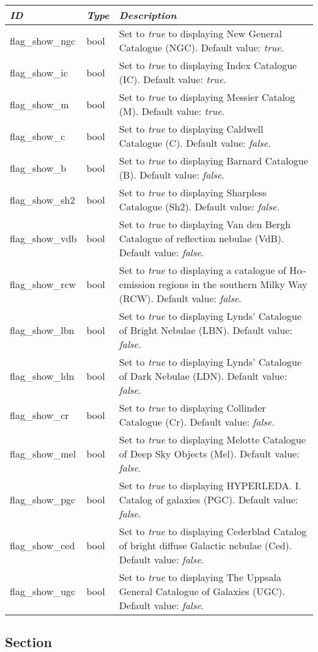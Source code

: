 \begin{longtabu} to \textwidth {l|l|X}
\toprule
\emph{ID} & \emph{Type} & \emph{Description}\tabularnewline
\midrule
flag\_show\_ngc & bool & Set to \emph{true} to displaying New General Catalogue (NGC). Default value: \emph{true}. \tabularnewline
\midrule
flag\_show\_ic & bool & Set to \emph{true} to
displaying Index Catalogue (IC). Default value: \emph{true}. \tabularnewline
\midrule
flag\_show\_m & bool & Set to \emph{true} to displaying Messier Catalog (M). Default value: \emph{true}. \tabularnewline
\midrule
flag\_show\_c & bool & Set to \emph{true} to displaying Caldwell Catalogue (C). Default value: \emph{false}. \tabularnewline
\midrule
flag\_show\_b & bool & Set to \emph{true} to displaying Barnard Catalogue (B). Default value: \emph{false}. \tabularnewline
\midrule
flag\_show\_sh2 & bool & Set to \emph{true} to displaying Sharpless Catalogue (Sh2). Default value: \emph{false}. \tabularnewline
\midrule
flag\_show\_vdb & bool & Set to \emph{true} to displaying Van den Bergh Catalogue of reflection nebulae (VdB). Default value: \emph{false}. \tabularnewline
\midrule
flag\_show\_rcw & bool & Set to \emph{true} to displaying a catalogue of H$\alpha$-emission regions in the southern Milky Way (RCW). Default value: \emph{false}. \tabularnewline
\midrule
flag\_show\_lbn & bool & Set to \emph{true} to displaying Lynds' Catalogue of Bright Nebulae (LBN). Default value: \emph{false}. \tabularnewline
\midrule
flag\_show\_ldn & bool & Set to \emph{true} to displaying Lynds' Catalogue of Dark Nebulae (LDN). Default value: \emph{false}. \tabularnewline
\midrule
flag\_show\_cr & bool & Set to \emph{true} to displaying Collinder Catalogue (Cr). Default value: \emph{false}. \tabularnewline
\midrule
flag\_show\_mel & bool & Set to \emph{true} to displaying Melotte Catalogue of Deep Sky Objects (Mel). Default value: \emph{false}. \tabularnewline
\midrule
flag\_show\_pgc & bool & Set to \emph{true} to displaying HYPERLEDA. I. Catalog of galaxies (PGC). Default value: \emph{false}. \tabularnewline
\midrule
flag\_show\_ced & bool & Set to \emph{true} to displaying Cederblad Catalog of bright diffuse Galactic nebulae (Ced). Default value: \emph{false}. \tabularnewline
\midrule
flag\_show\_ugc & bool & Set to \emph{true} to displaying The Uppsala General Catalogue of Galaxies (UGC). Default value: \emph{false}. \tabularnewline
\bottomrule
\end{longtabu}

\subsection{Section
}\label{section-dsoux5ftypeux5ffilters}

